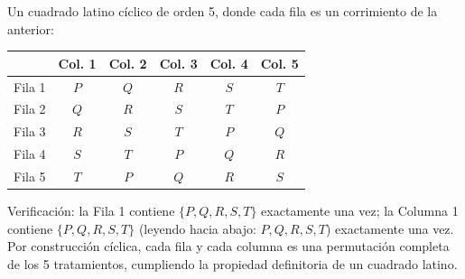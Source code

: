 \begin{solproblema}[prob:c1de238]
	Un cuadrado latino cíclico de orden 5, donde cada fila es un corrimiento de la anterior:
	\begin{center}
		\begin{tabular}{c|ccccc}
			 & Col. 1 & Col. 2 & Col. 3 & Col. 4 & Col. 5 \\ \hline
			Fila 1 & $P$ & $Q$ & $R$ & $S$ & $T$ \\
			Fila 2 & $Q$ & $R$ & $S$ & $T$ & $P$ \\
			Fila 3 & $R$ & $S$ & $T$ & $P$ & $Q$ \\
			Fila 4 & $S$ & $T$ & $P$ & $Q$ & $R$ \\
			Fila 5 & $T$ & $P$ & $Q$ & $R$ & $S$ \\
		\end{tabular}
	\end{center}
	Verificación: la Fila 1 contiene $\{P,Q,R,S,T\}$ exactamente una vez; la Columna 1 contiene $\{P,Q,R,S,T\}$ (leyendo hacia abajo: $P,Q,R,S,T$) exactamente una vez. Por construcción cíclica, cada fila y cada columna es una permutación completa de los 5 tratamientos, cumpliendo la propiedad definitoria de un cuadrado latino.
\end{solproblema}
